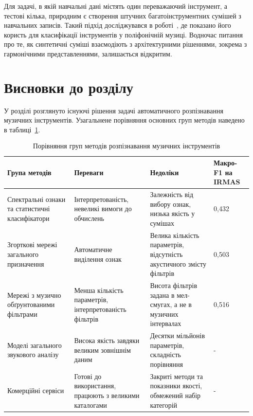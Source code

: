Для задачі, в якій навчальні дані містять один переважаючий інструмент, а
тестові кілька, природним є створення штучних
багатоінструментних сумішей з навчальних записів. Такий підхід
досліджувався в роботі~\cite{kratimenos2021}, де показано його користь для
класифікації інструментів у поліфонічній музиці. Водночас питання про те,
як синтетичні суміші взаємодіють з архітектурними рішеннями, зокрема з
гармонічними представленнями, залишається відкритим.

\section{Висновки до розділу}
\label{sec:ch1_conclusions}

У розділі розглянуто існуючі рішення задачі автоматичного розпізнавання
музичних інструментів. Узагальнене порівняння основних груп методів
наведено в таблиці~\ref{tab:review}.

\begin{table}[H]
\centering
\caption{Порівняння груп методів розпізнавання музичних інструментів}
\label{tab:review}
\small
\begin{tabular}{|p{3.4cm}|p{4.6cm}|p{4.6cm}|p{2.6cm}|}
\hline
Група методів & Переваги & Недоліки &
Макро-F1 на IRMAS \\
\hline
Спектральні ознаки та статистичні класифікатори~\cite{irmas2012} &
Інтерпретованість, невеликі вимоги до обчислень &
Залежність від вибору ознак, низька якість у сумішах &
0,432 \\
\hline
Згорткові мережі загального призначення~\cite{han2017} &
Автоматичне виділення ознак &
Велика кількість параметрів, відсутність акустичного змісту фільтрів &
0,503 \\
\hline
Мережі з музично обґрунтованими фільтрами~\cite{pons2017} &
Менша кількість параметрів, інтерпретованість фільтрів &
Висота фільтрів задана в мел-смугах, а не в музичних інтервалах &
0,516 \\
\hline
Моделі загального звукового аналізу~\cite{kong2020} &
Висока якість завдяки великим зовнішнім даним &
Десятки мільйонів параметрів, складність порівняння &
- \\
\hline
Комерційні сервіси~\cite{cyanite,izotope} &
Готові до використання, працюють з великими каталогами &
Закриті методи та показники якості, обмежений набір категорій &
- \\
\hline
\end{tabular}
\end{table}

